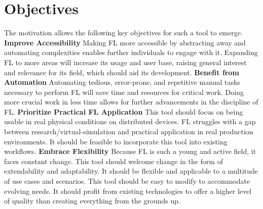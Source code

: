 \section{Objectives}

The motivation allows the following key objectives for such a tool to emerge.
\vspace{5mm}
\newline
\textbf{Improve Accessibility}\newline
Making FL more accessible by abstracting away and automating complexities enables further individuals to engage with it.
Expanding FL to more areas will increase its usage and user base, raising general interest and relevance for its field, which should aid its development.
\vspace{5mm}
\newline
\textbf{Benefit from Automation}\newline
Automating tedious, error-prone, and repetitive manual tasks necessary to perform FL will save time and resources for critical work.
Doing more crucial work in less time allows for further advancements in the discipline of FL.
\vspace{5mm}
\newline
\textbf{Prioritize Practical FL Application}\newline
This tool should focus on being usable in real physical conditions on distributed devices.
FL struggles with a gap between research/virtual-simulation and practical application in real production environments.
It should be feasible to incorporate this tool into existing workflows.
\vspace{5mm}
\newline
\textbf{Embrace Flexibility}\newline
Because FL is such a young and active field, it faces constant change.
This tool should welcome change in the form of extendability and adaptability.
It should be flexible and applicable to a multitude of use cases and scenarios.
This tool should be easy to modify to accommodate evolving needs.
It should profit from existing technologies to offer a higher level of quality than creating everything from the grounds up.
